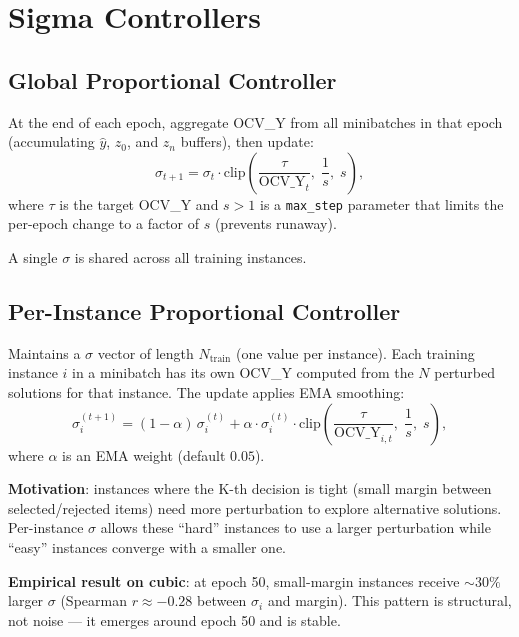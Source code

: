 \documentclass[11pt]{article}
\begin{document}
\section{Sigma Controllers}

\subsection{Global Proportional Controller}

At the end of each epoch, aggregate OCV\_Y from all minibatches in that
epoch (accumulating $\hat{y}$, $z_0$, and $z_n$ buffers), then update:
\begin{equation}
  \sigma_{t+1} = \sigma_t \cdot
    \mathrm{clip}\!\left(\frac{\tau}{\mathrm{OCV\_Y}_t},\;
    \frac{1}{s},\; s\right),
  \label{eq:global-update}
\end{equation}
where $\tau$ is the target OCV\_Y and $s > 1$ is a \texttt{max\_step}
parameter that limits the per-epoch change to a factor of $s$
(prevents runaway).

A single $\sigma$ is shared across all training instances.

\subsection{Per-Instance Proportional Controller}

Maintains a $\sigma$ vector of length $N_\mathrm{train}$
(one value per instance). Each training instance $i$ in a minibatch
has its own OCV\_Y computed from the $N$ perturbed solutions for that
instance. The update applies EMA smoothing:
\begin{equation}
  \sigma_i^{(t+1)} = (1 - \alpha)\,\sigma_i^{(t)}
    + \alpha \cdot \sigma_i^{(t)} \cdot
    \mathrm{clip}\!\left(\frac{\tau}{\mathrm{OCV\_Y}_{i,t}},\;
    \frac{1}{s},\; s\right),
  \label{eq:pi-update}
\end{equation}
where $\alpha$ is an EMA weight (default $0.05$).

\textbf{Motivation}: instances where the K-th decision is tight (small
margin between selected/rejected items) need more perturbation to explore
alternative solutions. Per-instance $\sigma$ allows these ``hard''
instances to use a larger perturbation while ``easy'' instances converge
with a smaller one.

\textbf{Empirical result on cubic}: at epoch 50, small-margin instances
receive $\sim 30\%$ larger $\sigma$ (Spearman $r \approx -0.28$ between
$\sigma_i$ and margin). This pattern is structural, not noise --- it
emerges around epoch 50 and is stable.
\end{document}
